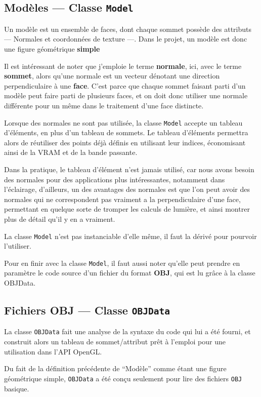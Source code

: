 \documentclass[11pt, a4paper, titlepage]{article}
\begin{document}
\subsection{Modèles --- Classe \texttt{Model}}

Un modèle est un ensemble de faces, dont chaque sommet possède des
attributs --- Normales et coordonnées de texture ---.  Dans le projet,
un modèle est donc une figure géométrique \textbf{simple}

Il est intéressant de noter que j'emploie le terme \textbf{normale},
ici, avec le terme \textbf{sommet}, alors qu'une normale est un
vecteur dénotant une direction perpendiculaire à une
\textbf{face}. C'est parce que chaque sommet faisant parti d'un modèle
peut faire parti de plusieurs faces, et on doit donc utiliser une
normale différente pour un même dans le traitement d'une face
distincte.

Lorsque des normales ne sont pas utilisée, la classe \texttt{Model}
accepte un tableau d'éléments, en plus d'un tableau de sommets. Le
tableau d'éléments permettra alors de réutiliser des points déjà
définis en utilisant leur indices, économisant ainsi de la VRAM et de
la bande passante.

Dans la pratique, le tableau d'élément n'est jamais utilisé, car nous
avons besoin des normales pour des applications plus intéressantes,
notamment dans l'éclairage, d'ailleurs, un des avantages des normales
est que l'on peut avoir des normales qui ne correspondent pas vraiment
a la perpendiculaire d'une face, permettant en quelque sorte de
tromper les calculs de lumière, et ainsi montrer plus de détail qu'il
y en a vraiment.

La classe \texttt{Model} n'est pas instanciable d'elle même, il faut
la dérivé pour pourvoir l'utiliser.

Pour en finir avec la classe \texttt{Model}, il faut aussi noter
qu'elle peut prendre en paramètre le code source d'un fichier du
format \textbf{OBJ}, qui est lu grâce à la classe OBJData.

\pagebreak
\subsection{Fichiers OBJ --- Classe \texttt{OBJData}}

La classe \texttt{OBJData} fait une analyse de la syntaxe du code qui
lui a été fourni, et construit alors un tableau de sommet/attribut
prêt à l'emploi pour une utilisation dans l'API OpenGL.

Du fait de la définition précédente de ``Modèle'' comme étant une
figure géométrique simple, \texttt{OBJData} a été conçu seulement pour
lire des fichiers \texttt{OBJ} basique.
\end{document}
